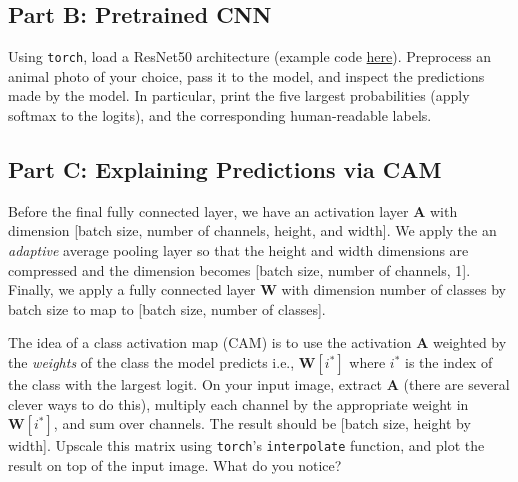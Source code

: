 \documentclass{article}
\begin{document}
\subsection*{Part B: Pretrained CNN}
Using \texttt{torch}, load a ResNet50 architecture (example code \href{https://pytorch.org/hub/nvidia_deeplearningexamples_resnet50/}{here}).
Preprocess an animal photo of your choice, pass it to the model, and inspect the predictions made by the model.
In particular, print the five largest probabilities (apply softmax to the logits), and the corresponding human-readable labels.

\subsection*{Part C: Explaining Predictions via CAM}
Before the final fully connected layer, we have an activation layer $\mathbf{A}$ with dimension [batch size, number of channels, height, and width].
We apply the an \textit{adaptive} average pooling layer so that the height and width dimensions are compressed and the dimension becomes [batch size, number of channels, 1].
Finally, we apply a fully connected layer $\mathbf{W}$ with dimension number of classes by batch size to map to [batch size, number of classes].


The idea of a class activation map (CAM) is to use the activation $\mathbf{A}$ weighted by the \textit{weights} of the class the model predicts i.e., $\mathbf{W}[i^*]$ where $i^*$ is the index of the class with the largest logit.
On your input image, extract $\mathbf{A}$ (there are several clever ways to do this), multiply each channel by the appropriate weight in $\mathbf{W}[i^*]$, and sum over channels.
The result should be [batch size, height by width].
Upscale this matrix using \texttt{torch}'s \texttt{interpolate} function, and plot the result on top of the input image.
What do you notice?

%
\end{document}

